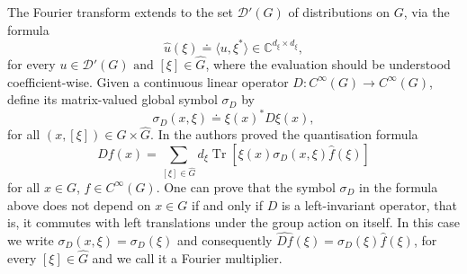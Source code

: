 \documentclass[11pt]{amsart}
\numberwithin{theorem}{section}
\numberwithin{equation}{section}
\theoremstyle{definition}
\numberwithin{example}{section}
\theoremstyle{definition}
\theoremstyle{definition}
\newtheorem{definition}[theorem]{Definition}
\newcommand{\R}{\mathbb{R}}
\newcommand{\Tr}{\operatorname{Tr}}
\begin{document}
The Fourier transform extends to the set $\mathcal{D}'(G)$ of distributions on $G$, via the formula
\begin{equation*}
    \widehat{u}(\xi)\doteq\langle u,\xi^*\rangle\in\mathbb{C}^{d_\xi\times d_\xi}, 
\end{equation*}
for every $u\in\mathcal{D}'(G) \text{ and } [\xi]\in\widehat{G}$, where the evaluation should be understood coefficient-wise.
Given a continuous linear operator $D:C^\infty(G)\to C^\infty(G)$, define its matrix-valued global symbol $\sigma_D$ by
\begin{equation*}
    \sigma_D(x,\xi)\doteq \xi(x)^*D\xi(x),
\end{equation*}
for all $(x,[\xi])\in G\times\widehat{G}$. In \cite{Ruz} the authors proved the quantisation formula
\begin{equation}\label{quantisation} Df(x)=\sum_{[\xi]\in\widehat{G}}d_\xi\Tr\left[\xi(x)\sigma_D(x,\xi)\widehat{f}(\xi)\right]
\end{equation}
for all $x\in G$, $f\in C^\infty(G)$. One can prove that the symbol $\sigma_D$ in the formula above does not depend on $x\in G$ if and only if $D$ is a left-invariant operator, that is, it commutes with  left translations under the group action on itself. In this case we write $\sigma_D(x,\xi)=\sigma_D(\xi)$ and consequently $\widehat{Df}(\xi)=\sigma_D(\xi)\widehat{f}(\xi)$, for every $[\xi]\in\widehat{G}$ and we call it a Fourier multiplier.



\end{document}
